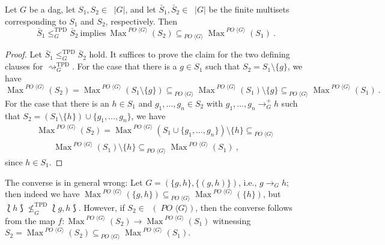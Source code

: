 \documentclass[english]{notes}
\let\lbagold\lbag
\let\rbagold\rbag
\def\lbag{\mathopen{\lbagold}}
\def\rbag{\mathclose{\rbagold}}
\DeclareMathOperator{\Maxop}{\mathrm{Max}}
\newcommand{\Max}[1]{\Maxop^{#1}}
\DeclareMathOperator{\finsets}{\mathcal{P}_{\mathrm{fin}}}
\DeclareMathOperator{\incsets}{\mathcal{I}}
\DeclareMathOperator{\incfinsets}{\incsets_{\mathrm{fin}}}
\newcommand{\lowersubseteq}[1]{\mathrel{\subseteq_{#1}}}
\DeclareMathOperator{\finmsets}{\mathcal{M}_{\mathrm{fin}}}
\newcommand{\functor}[1]{\mathit{#1}}
\DeclareMathOperator{\POfun}{\functor{PO}}
\newcommand{\POfree}[1]{\POfun\langle#1\rangle}
\newcommand{\XPDrel}[2][p]{\rightsquigarrow^{#1}_{#2}}
\newcommand{\XPDleq}[2][p]{\leq^{#1}_{#2}}
\newcommand{\TPDrel}{\XPDrel[\mathrm{TPD}]}
\newcommand{\TPDleq}{\XPDleq[\mathrm{TPD}]}
\begin{document}
\begin{lemma}
Let $G$ be a dag, let $S_1, S_2 \in \finsets |G|$, and let $\bar{S}_1,
\bar{S}_2 \in \finmsets |G|$ be the finite multisets corresponding to
$S_1$ and $S_2$, respectively.  Then
%
\begin{equation*}
  \bar{S}_1 \TPDleq{G} \bar{S}_2
\ \text{implies}\
  \Max{\POfree{G}}(S_2) \lowersubseteq{\POfree{G}} \Max{\POfree{G}}(S_1)
\ \text{.}
\end{equation*}
\end{lemma}
\begin{proof}
Let $\bar{S}_1 \TPDleq{G} \bar{S}_2$ hold.  It suffices to prove the
claim for the two defining clauses for $\TPDrel{G}$.  For the case
that there is a $g \in S_1$ such that $S_2 = S_1 \setminus \{ g \}$,
we have
%
\begin{equation*}
  \Max{\POfree{G}}(S_2)
=
  \Max{\POfree{G}}(S_1 \setminus \{ g \})
\lowersubseteq{\POfree{G}}
  \Max{\POfree{G}}(S_1) \setminus \{ g \}
\lowersubseteq{\POfree{G}}
  \Max{\POfree{G}}(S_1)
\ \text{.}
\end{equation*}
%
For the case that there is an $h \in S_1$ and $g_1, \ldots, g_n \in
S_2$ with $g_1, \ldots, g_n \rightarrow_G^+ h$ such that $S_2 = (S_1
\setminus \{ h \}) \cup \{ g_1, \ldots, g_n \}$, we have
%
\begin{gather*}
  \Max{\POfree{G}}(S_2)
=
  \Max{\POfree{G}}(S_1 \cup \{ g_1, \ldots, g_n \}) \setminus \{ h \}
\lowersubseteq{\POfree{G}}{}\\\qquad
  \Max{\POfree{G}}(S_1) \setminus \{ h \}
\lowersubseteq{\POfree{G}}
  \Max{\POfree{G}}(S_1)
\ \text{,}
\end{gather*}
since $h \in S_1$.
\end{proof}

The converse is in general wrong: Let $G = (\{ g, h \}, \{ (g, h)
\})$, i.e., $g \rightarrow_G h$; then indeed we have
$\Max{\POfree{G}}(\{ g, h \}) \lowersubseteq{\POfree{G}}
\Max{\POfree{G}}(\{ h \})$, but $\lbag h \rbag \not\TPDleq{G} \lbag g,
h \rbag$.  However, if $S_2 \in \incfinsets(\POfree{G})$, then the
converse follows from the map $f : \Max{\POfree{G}}(S_2) \to
\Max{\POfree{G}}(S_1)$ witnessing $S_2 = \Max{\POfree{G}}(S_2)
\lowersubseteq{\POfree{G}} \Max{\POfree{G}}(S_1)$.
\end{document}
